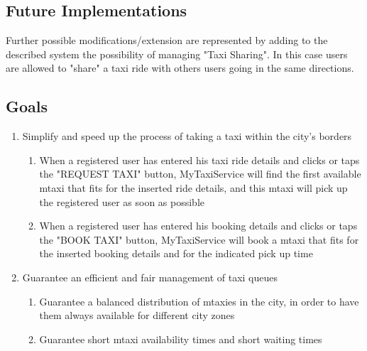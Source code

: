 \documentclass[11pt,titlepage]{article} %
\begin{document}
  \subsection{Future Implementations}
	Further possible modifications/extension are represented by adding to the described system 
	the possibility of managing "Taxi Sharing". In this case users are allowed to "share" a taxi ride with others
	users going in the same directions.

  \subsection{Goals}
	\begin{enumerate}
	    \item Simplify and speed up the process of taking a taxi within the city's borders
		\begin{enumerate}
		      \item When a registered user has entered his taxi ride details and clicks or taps
		      the "REQUEST TAXI" button, MyTaxiService will find the first
		      available mtaxi that fits for the inserted ride details, and this mtaxi will
		      pick up the registered user as soon as possible
		
		      \item When a registered user has entered his booking details and clicks or taps
		        the "BOOK TAXI" button, MyTaxiService will book a mtaxi that fits for the
		        inserted booking details and for the indicated pick up time
		\end{enumerate}
	
	    \item Guarantee an efficient and fair management of taxi queues
	  	\begin{enumerate}
		      \item Guarantee a balanced distribution of mtaxies in the city, in order
		      to have them always available for different city zones
		
		      \item Guarantee short mtaxi availability times and short waiting times
		\end{enumerate}
	\end{enumerate}
\end{document}
